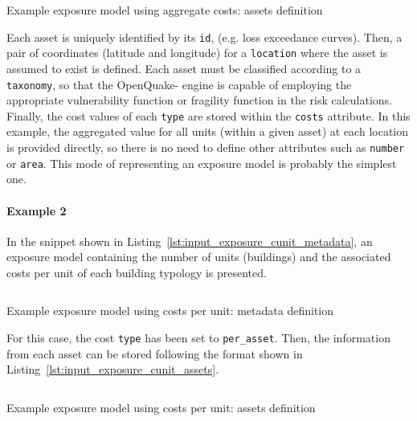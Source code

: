 \begin{listing}[htbp]
  \inputminted[firstline=19,firstnumber=19,lastline=29,fontsize=\footnotesize,frame=single,linenos,bgcolor=lightgray]{xml}{oqum/risk/Verbatim/input_exposure_cagg.xml}
  \caption{Example exposure model using aggregate costs: assets definition}
  \label{lst:input_exposure_cagg_assets}
\end{listing}

Each \gls{asset} is uniquely identified by its \Verb+id+, (e.g. loss
exceedance curves). Then, a pair of coordinates (latitude and longitude) for a
\Verb+location+ where the asset is assumed to exist is defined. Each asset
must be classified according to a \Verb+taxonomy+, so that the OpenQuake-
engine is capable of employing the appropriate \gls{vulnerability function} or
\gls{fragility function} in the risk calculations. Finally, the cost values of
each \Verb+type+ are stored within the \Verb+costs+ attribute. In this
example, the aggregated value for all units (within a given asset) at each
location is provided directly, so there is no need to define other attributes
such as \Verb+number+ or \Verb+area+. This mode of representing an exposure
model is probably the simplest one.


\paragraph{Example 2}

In the snippet shown in Listing~\ref{lst:input_exposure_cunit_metadata}, an
\gls{exposure model} containing the number of units (buildings) and the
associated costs per unit of each building typology is presented.

\begin{listing}[htbp]
  \inputminted[firstline=8,firstnumber=8,lastline=18,fontsize=\footnotesize,frame=single,linenos,bgcolor=lightgray]{xml}{oqum/risk/Verbatim/input_exposure_cunit.xml}
  \caption{Example exposure model using costs per unit: metadata definition}
  \label{lst:input_exposure_cunit_metadata}
\end{listing}

For this case, the cost \Verb+type+ has been set to \Verb+per_asset+. Then,
the information from each asset can be stored following the format shown in
Listing~\ref{lst:input_exposure_cunit_assets}.

\begin{listing}[htbp]
  \inputminted[firstline=19,firstnumber=19,lastline=29,fontsize=\footnotesize,frame=single,linenos,bgcolor=lightgray]{xml}{oqum/risk/Verbatim/input_exposure_cunit.xml}
  \caption{Example exposure model using costs per unit: assets definition}
  \label{lst:input_exposure_cunit_assets}
\end{listing}

